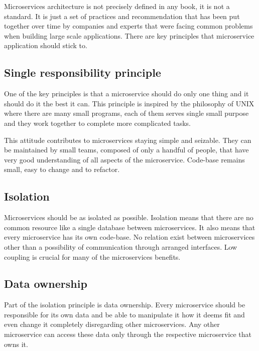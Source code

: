 \documentclass[12pt,oneside]{fithesis2}
\begin{document}

Microservices architecture is not precisely defined in any book, it is not a standard. It is just a set of practices and recommendation that has been put together over time by companies and experts that were facing common problems when building large scale applications. There are key principles that microservice application should stick to.

\subsection{Single responsibility principle}

One of the key principles is that a microservice should do only one thing and it should do it the best it can. This principle is inspired by the philosophy of UNIX where there are many small programs, each of them serves single small purpose and they work together to complete more complicated tasks.

This attitude contributes to microservices staying simple and seizable. They can be maintained by small teams, composed of only a handful of people, that have very good understanding of all aspects of the microservice. Code-base remains small, easy to change and to refactor.

\subsection{Isolation}

Microservices should be as isolated as possible. Isolation means that there are no common resource like a single database between microservices. It also means that every microservice has its own code-base. No relation exist between microservices other than a possibility of communication through arranged interfaces. Low coupling is crucial for many of the microservices benefits.

\subsection{Data ownership}

Part of the isolation principle is data ownership. Every microservice should be responsible for its own data and be able to manipulate it how it deems fit and even change it completely disregarding other microservices. Any other microservice can access these data only through the respective microservice that owns it.
\end{document}
